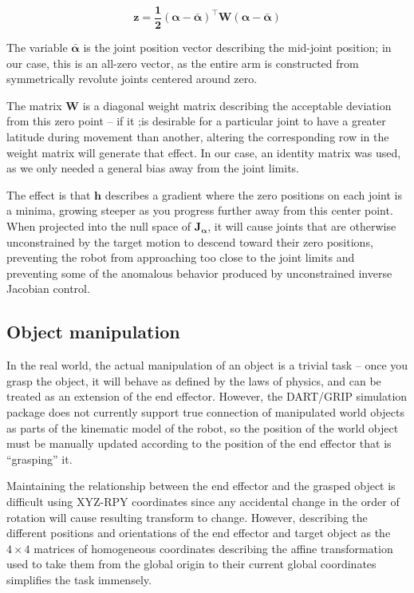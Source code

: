 \documentclass[10pt, conference]{IEEEtran}
\begin{document}
\begin{itemize}
     \begin{equation}
     \label{eq:z}
     \mathbf{ z = \frac{1}{2}(\alpha - \bar{\alpha})^{\top}W(\alpha -
     \bar{\alpha})}
     \end{equation}

     The variable \(\mathbf{\bar{\alpha}}\) is the joint position vector
     describing the mid-joint position; in our case, this is an all-zero
     vector, as the entire arm is constructed from symmetrically
     revolute joints centered around zero.

     The matrix \( \mathbf{W} \) is a diagonal weight matrix describing
     the acceptable deviation from this zero point -- if it ;is desirable
     for a particular joint to have a greater latitude during movement
     than another, altering the corresponding row in the weight matrix
     will generate that effect. In our case, an identity matrix was
     used, as we only needed a general bias away from the joint limits.

     The effect is that \(\mathbf{h}\) describes a gradient where the
     zero positions on each joint is a minima, growing steeper as you
     progress further away from this center point. When projected into
     the null space of \(\mathbf{J_\alpha}\), it will cause joints that
     are otherwise unconstrained by the target motion to descend toward
     their zero positions, preventing the robot from approaching too
     close to the joint limits and preventing some of the anomalous
     behavior produced by unconstrained inverse Jacobian control.

\end{itemize} %
\subsection{Object manipulation}
\label{sec-3-5}

   In the real world, the actual manipulation of an object is a trivial
   task -- once you grasp the object, it will behave as defined by the
   laws of physics, and can be treated as an extension of the end
   effector. However, the DART/GRIP simulation package does not
   currently support true connection of manipulated world objects as
   parts of the kinematic model of the robot, so the position of the
   world object must be manually updated according to the position of
   the end effector that is ``grasping'' it.

   Maintaining the relationship between the end effector and the grasped
   object is difficult using XYZ-RPY coordinates since any accidental
   change in the order of rotation will cause resulting transform to
   change. However, describing the different positions and orientations
   of the end effector and target object as the \(4 \times 4\) matrices
   of homogeneous coordinates describing the affine transformation used
   to take them from the global origin to their current global
   coordinates simplifies the task immensely.
\end{document}

